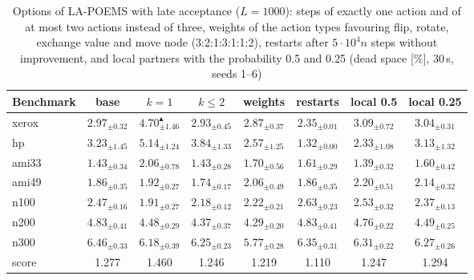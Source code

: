 \begin{table}
\centering
\footnotesize
\begin{tabular}{@{}lccccccc@{}}
\toprule
Benchmark & base & $k = 1$ & $k \leq 2$ & weights & restarts & local 0.5 & local 0.25 \\
\midrule
xerox & $2.97_{\pm 0.32}$ & $4.70_{\pm 1.46}^{\blacktriangle}$ & $2.93_{\pm 0.45}$ & $2.87_{\pm 0.37}$ & $2.35_{\pm 0.01}$ & $3.09_{\pm 0.72}$ & $3.04_{\pm 0.31}$ \\
hp & $3.23_{\pm 1.45}$ & $5.14_{\pm 1.24}$ & $3.84_{\pm 1.33}$ & $2.57_{\pm 1.25}$ & $\mathbf{1.32_{\pm 0.00}}$ & $2.33_{\pm 1.08}$ & $3.13_{\pm 1.32}$ \\
ami33 & $1.43_{\pm 0.34}$ & $2.06_{\pm 0.78}$ & $1.43_{\pm 0.28}$ & $1.70_{\pm 0.56}$ & $1.61_{\pm 0.29}$ & $1.39_{\pm 0.32}$ & $1.60_{\pm 0.42}$ \\
ami49 & $1.86_{\pm 0.35}$ & $1.92_{\pm 0.27}$ & $1.74_{\pm 0.17}$ & $2.06_{\pm 0.49}$ & $1.86_{\pm 0.35}$ & $2.20_{\pm 0.51}$ & $2.14_{\pm 0.32}$ \\
n100 & $2.47_{\pm 0.16}$ & $\mathbf{1.91_{\pm 0.27}}$ & $\mathbf{2.18_{\pm 0.12}}$ & $\mathbf{2.22_{\pm 0.21}}$ & $2.63_{\pm 0.23}$ & $2.53_{\pm 0.32}$ & $2.37_{\pm 0.13}$ \\
n200 & $4.83_{\pm 0.41}$ & $4.48_{\pm 0.29}$ & $4.37_{\pm 0.37}$ & $4.29_{\pm 0.20}$ & $4.83_{\pm 0.41}$ & $4.76_{\pm 0.22}$ & $4.49_{\pm 0.25}$ \\
n300 & $6.46_{\pm 0.33}$ & $6.18_{\pm 0.39}$ & $6.25_{\pm 0.23}$ & $\mathbf{5.77_{\pm 0.28}}$ & $6.35_{\pm 0.31}$ & $6.31_{\pm 0.22}$ & $6.27_{\pm 0.26}$ \\
\midrule
score & 1.277 & 1.460 & 1.246 & 1.219 & 1.110 & 1.247 & 1.294 \\
\bottomrule
\end{tabular}
\caption{Options of LA-POEMS with late acceptance ($L = 1000$): steps of exactly one action and of at most two actions instead of three, weights of the action types favouring flip, rotate, exchange value and move node (3:2:1:3:1:1:2), restarts after $5 \cdot 10^4 n$ steps without improvement, and local partners with the probability 0.5 and 0.25 (dead space [\%], 30\,s, seeds 1--6)}
\label{tab:rq3lahc}
\end{table}

